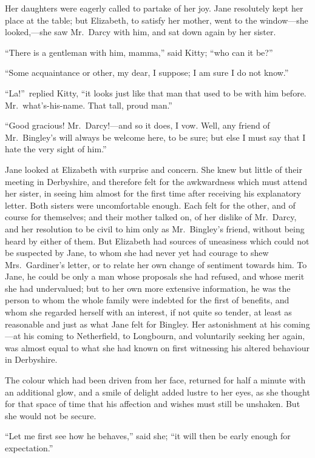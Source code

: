 \documentclass[12pt,english]{book}
\begin{document}
Her daughters were eagerly called to partake of her joy. Jane resolutely
kept her place at the table; but Elizabeth, to satisfy her mother,
went to the window\mbox{---}she looked,\mbox{---}she saw Mr.\ Darcy
with him, and sat down again by her sister.

{}``There is a gentleman with him, mamma,'' said Kitty; {}``who
can it be?''\ 

{}``Some acquaintance or other, my dear, I suppose; I am sure I do
not know.''

{}``La!''\ replied Kitty, {}``it looks just like that man that
used to be with him before. Mr.\ what's-his-name. That tall, proud
man.''

{}``Good gracious! Mr.\ Darcy!\mbox{---}and so it does, I vow.
Well, any friend of Mr.\ Bingley's will always be welcome here, to
be sure; but else I must say that I hate the very sight of him.''

Jane looked at Elizabeth with surprise and concern. She knew but little
of their meeting in Derbyshire, and therefore felt for the awkwardness
which must attend her sister, in seeing him almost for the first time
after receiving his explanatory letter. Both sisters were uncomfortable
enough. Each felt for the other, and of course for themselves; and
their mother talked on, of her dislike of Mr.\ Darcy, and her resolution
to be civil to him only as Mr.\ Bingley's friend, without being heard
by either of them. But Elizabeth had sources of uneasiness which could
not be suspected by Jane, to whom she had never yet had courage to
shew Mrs.\ Gardiner's letter, or to relate her own change of sentiment
towards him. To Jane, he could be only a man whose proposals she had
refused, and whose merit she had undervalued; but to her own more
extensive information, he was the person to whom the whole family
were indebted for the first of benefits, and whom she regarded herself
with an interest, if not quite so tender, at least as reasonable and
just as what Jane felt for Bingley. Her astonishment at his coming\mbox{---}at
his coming to Netherfield, to Longbourn, and voluntarily seeking her
again, was almost equal to what she had known on first witnessing
his altered behaviour in Derbyshire.

The colour which had been driven from her face, returned for half
a minute with an additional glow, and a smile of delight added lustre
to her eyes, as she thought for that space of time that his affection
and wishes must still be unshaken. But she would not be secure.

{}``Let me first see how he behaves,'' said she; {}``it will then
be early enough for expectation.''
\end{document}
